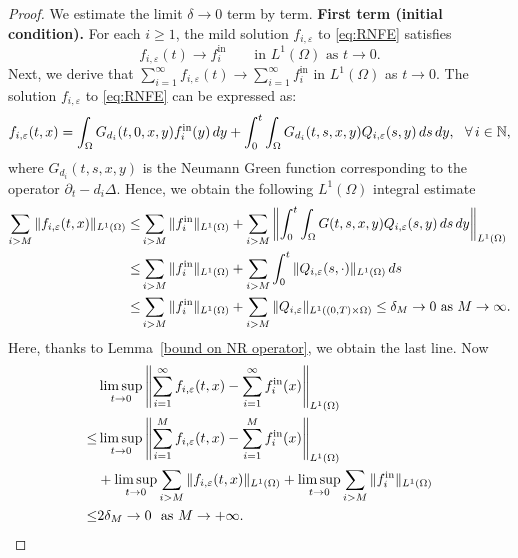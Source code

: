 \documentclass[a4paper,12pt,reqno]{amsart}
\theoremstyle{plain}
\numberwithin{equation}{section}
\begin{document}
	\begin{proof}
		We estimate the limit $\delta\to 0$ term by term. 
		\newline
		\textbf{First term (initial condition).}
		For each $i\ge1$, the mild solution $f_{i,\varepsilon}$ to \eqref{eq:RNFE} satisfies
		\[
		f_{i,\varepsilon}(t) \longrightarrow f_i^{\mathrm{in}}
		\qquad \text{in } L^1(\Omega) \text{ as } t\to0 .
		\]
		Next, we derive that $\displaystyle{\sum\limits_{i=1}^{\infty}f_{i,\varepsilon}(t) \longrightarrow \sum\limits_{i=1}^{\infty}f_i^{\mathrm{in}}}$ in  $L^1(\Omega)$ as  $t\to0 $. The solution $f_{i,\varepsilon}$ to \eqref{eq:RNFE} can be expressed as:
		\begin{align}\label{representation regularization}
			f_{i,\varepsilon}(t,x)= \int_{\Omega}G_{d_i}(t,0,x,y)f_i^{\rm{in}}(y)\, dy+\int_{0}^{t}\int_{\Omega} G_{d
				_i}(t,s,x,y)Q_{i,\varepsilon}(s,y) \, ds\, dy, \ \ \forall \, i\in\mathbb{N},
		\end{align}
		where $G_{d_i}(t,s,x,y)$ is the Neumann Green function corresponding to the operator $\partial_t-d_i\Delta$. Hence, we obtain the following $L^1(\Omega)$ integral estimate
		\begin{align*}
			\sum_{i>M} \|f_{i,\varepsilon}(t,x)\|_{L^1(\Omega)} \leq &\sum_{i>M} \| f_i^{\rm{in}}\|_{L^1(\Omega)}+ \sum_{i>M} \left\| \int_{0}^{t}\int_{\Omega} G(t,s,x,y)Q_{i,\varepsilon}(s,y) \, ds\, dy\right\|_{L^1(\Omega)}\\
			\leq & \sum_{i>M} \| f_i^{\rm{in}}\|_{L^1(\Omega)}+ \sum_{i>M} \int_{0}^{t} \| Q_{i,\varepsilon}(s,\cdot)\|_{L^1(\Omega)} \, ds\\
			\leq &\sum_{i>M} \| f_i^{\rm{in}}\|_{L^1(\Omega)}+\sum_{i>M} \| Q_{i,\varepsilon}\|_{L^1((0,T)\times\Omega)} \leq \delta_M\to 0 \ \mbox{as}\ M\to \infty.
		\end{align*}
		Here, thanks to Lemma~\eqref{bound on NR operator}, we obtain the last line. Now
		\begin{align*}
			&\limsup\limits_{t\to 0}\left\| \sum_{i=1}^{\infty} f_{i,\varepsilon}(t,x)- \sum_{i=1}^{\infty} f_{i}^{\rm{in}}(x)\right\|_{L^1(\Omega)} \\
			\leq & \limsup\limits_{t\to 0}\left\| \sum_{i=1}^{M} f_{i,\varepsilon}(t,x)- \sum_{i=1}^{M} f_{i}^{\rm{in}}(x)\right\|_{L^1(\Omega)}\\
			&+ \limsup\limits_{t\to 0}\sum_{i>M} \|f_{i,\varepsilon}(t,x)\|_{L^1(\Omega)} +\limsup\limits_{t\to 0}\sum_{i>M} \| f_i^{\rm{in}}\|_{L^1(\Omega)}\\
			\leq & 2\delta_M \to 0 \ \ \mbox{as} \ M\to +\infty. 

\end{align*}
\end{proof}
\end{document}

